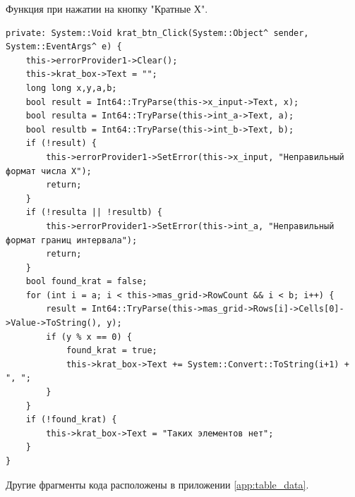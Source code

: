 Функция при нажатии на кнопку "Кратные Х".
\begin{verbatim}
private: System::Void krat_btn_Click(System::Object^ sender, System::EventArgs^ e) {
	this->errorProvider1->Clear();
	this->krat_box->Text = "";
	long long x,y,a,b;
	bool result = Int64::TryParse(this->x_input->Text, x);
	bool resulta = Int64::TryParse(this->int_a->Text, a);
	bool resultb = Int64::TryParse(this->int_b->Text, b);
	if (!result) {
		this->errorProvider1->SetError(this->x_input, "Неправильный формат числа X");
		return;
	}
	if (!resulta || !resultb) {
		this->errorProvider1->SetError(this->int_a, "Неправильный формат границ интервала");
		return;
	}
	bool found_krat = false;
	for (int i = a; i < this->mas_grid->RowCount && i < b; i++) {
		result = Int64::TryParse(this->mas_grid->Rows[i]->Cells[0]->Value->ToString(), y);
		if (y % x == 0) {
			found_krat = true;
			this->krat_box->Text += System::Convert::ToString(i+1) + ", ";
		}
	}
	if (!found_krat) {
		this->krat_box->Text = "Таких элементов нет";
	}
}
\end{verbatim}
Другие фрагменты кода расположены в приложении \ref{app:table_data}.
\sectionbreak